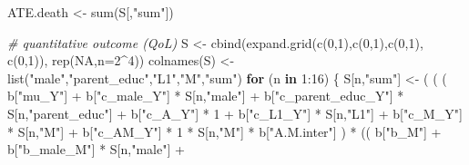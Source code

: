 \documentclass[
]{book}
\newenvironment{Shaded}{\begin{snugshade}}{\end{snugshade}}
\newcommand{\AttributeTok}[1]{\textcolor[rgb]{0.77,0.63,0.00}{#1}}
\newcommand{\CommentTok}[1]{\textcolor[rgb]{0.56,0.35,0.01}{\textit{#1}}}
\newcommand{\ConstantTok}[1]{\textcolor[rgb]{0.00,0.00,0.00}{#1}}
\newcommand{\ControlFlowTok}[1]{\textcolor[rgb]{0.13,0.29,0.53}{\textbf{#1}}}
\newcommand{\DecValTok}[1]{\textcolor[rgb]{0.00,0.00,0.81}{#1}}
\newcommand{\FunctionTok}[1]{\textcolor[rgb]{0.00,0.00,0.00}{#1}}
\newcommand{\NormalTok}[1]{#1}
\newcommand{\OtherTok}[1]{\textcolor[rgb]{0.56,0.35,0.01}{#1}}
\newcommand{\SpecialCharTok}[1]{\textcolor[rgb]{0.00,0.00,0.00}{#1}}
\newcommand{\StringTok}[1]{\textcolor[rgb]{0.31,0.60,0.02}{#1}}
\begin{document}
\begin{Shaded}
\begin{Highlighting}[]
\NormalTok{  ATE.death }\OtherTok{\textless{}{-}} \FunctionTok{sum}\NormalTok{(S[,}\StringTok{"sum"}\NormalTok{])}
  
  \CommentTok{\# quantitative outcome (QoL)}
\NormalTok{  S }\OtherTok{\textless{}{-}} \FunctionTok{cbind}\NormalTok{(}\FunctionTok{expand.grid}\NormalTok{(}\FunctionTok{c}\NormalTok{(}\DecValTok{0}\NormalTok{,}\DecValTok{1}\NormalTok{),}\FunctionTok{c}\NormalTok{(}\DecValTok{0}\NormalTok{,}\DecValTok{1}\NormalTok{),}\FunctionTok{c}\NormalTok{(}\DecValTok{0}\NormalTok{,}\DecValTok{1}\NormalTok{), }\FunctionTok{c}\NormalTok{(}\DecValTok{0}\NormalTok{,}\DecValTok{1}\NormalTok{)), }\FunctionTok{rep}\NormalTok{(}\ConstantTok{NA}\NormalTok{,}\AttributeTok{n=}\DecValTok{2}\SpecialCharTok{\^{}}\DecValTok{4}\NormalTok{))}
  \FunctionTok{colnames}\NormalTok{(S) }\OtherTok{\textless{}{-}} \FunctionTok{list}\NormalTok{(}\StringTok{"male"}\NormalTok{,}\StringTok{"parent\_educ"}\NormalTok{,}\StringTok{"L1"}\NormalTok{,}\StringTok{"M"}\NormalTok{,}\StringTok{"sum"}\NormalTok{)}
  \ControlFlowTok{for}\NormalTok{ (n }\ControlFlowTok{in} \DecValTok{1}\SpecialCharTok{:}\DecValTok{16}\NormalTok{) \{}
\NormalTok{    S[n,}\StringTok{"sum"}\NormalTok{] }\OtherTok{\textless{}{-}}\NormalTok{ ( ( ( b[}\StringTok{"mu\_Y"}\NormalTok{] }\SpecialCharTok{+} 
\NormalTok{                          b[}\StringTok{"c\_male\_Y"}\NormalTok{] }\SpecialCharTok{*}\NormalTok{ S[n,}\StringTok{"male"}\NormalTok{] }\SpecialCharTok{+} 
\NormalTok{                          b[}\StringTok{"c\_parent\_educ\_Y"}\NormalTok{] }\SpecialCharTok{*}\NormalTok{ S[n,}\StringTok{"parent\_educ"}\NormalTok{] }\SpecialCharTok{+}
\NormalTok{                          b[}\StringTok{"c\_A\_Y"}\NormalTok{] }\SpecialCharTok{*} \DecValTok{1} \SpecialCharTok{+}
\NormalTok{                          b[}\StringTok{"c\_L1\_Y"}\NormalTok{] }\SpecialCharTok{*}\NormalTok{ S[n,}\StringTok{"L1"}\NormalTok{] }\SpecialCharTok{+}
\NormalTok{                          b[}\StringTok{"c\_M\_Y"}\NormalTok{] }\SpecialCharTok{*}\NormalTok{ S[n,}\StringTok{"M"}\NormalTok{] }\SpecialCharTok{+} 
\NormalTok{                          b[}\StringTok{"c\_AM\_Y"}\NormalTok{] }\SpecialCharTok{*} \DecValTok{1} \SpecialCharTok{*}\NormalTok{ S[n,}\StringTok{"M"}\NormalTok{] }\SpecialCharTok{*}\NormalTok{ b[}\StringTok{"A.M.inter"}\NormalTok{] ) }\SpecialCharTok{*}
\NormalTok{                        (( b[}\StringTok{"b\_M"}\NormalTok{] }\SpecialCharTok{+} 
\NormalTok{                             b[}\StringTok{"b\_male\_M"}\NormalTok{] }\SpecialCharTok{*}\NormalTok{ S[n,}\StringTok{"male"}\NormalTok{] }\SpecialCharTok{+} 

\end{Highlighting}
\end{Shaded}
\end{document}
